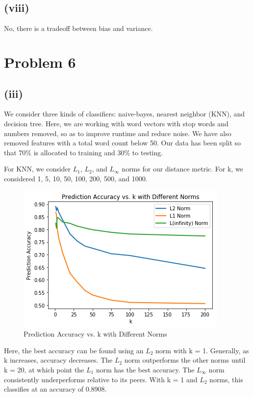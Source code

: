 \documentclass[twoside,11pt]{homework}
\begin{document}
\subsection*{(viii)}  
	No, there is a tradeoff between bias and variance.

\section*{Problem 6}
\subsection*{(iii)}
	We consider three kinds of classifiers: naive-bayes, nearest neighbor (KNN), and decision tree. Here, we are working with word vectors with stop words and numbers removed, so as to improve runtime and reduce noise. We have also removed features with a total word count below 50. Our data has been split so that 70\% is allocated to training and 30\% to testing.
	
	For KNN, we consider $L_1$, $L_2$, and $L_\infty$ norms for our distance metric. For k, we considered 1, 5, 10, 50, 100, 200, 500, and 1000.
	
		\begin{figure}[H]
		\centering
		\includegraphics[scale=.5]{q6_fig/knn_k.png}	
		\caption{Prediction Accuracy vs. k with Different Norms}
	\end{figure}

	Here, the best accuracy can be found using an $L_2$ norm with k = 1. Generally, as k increases, accuracy decreases. The $L_2$ norm outperforms the other norms until k = 20, at which point the $L_1$ norm has the best accuracy. The $L_\infty$ norm consistently underperforms relative to its peers. With k = 1 and $L_2$ norms, this classifies at an accuracy of 0.8908.
	
\end{document}
